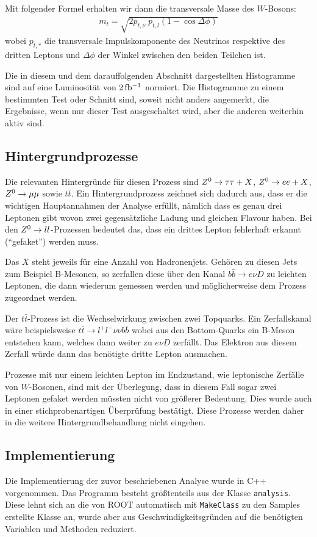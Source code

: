 Mit folgender Formel erhalten wir dann die transversale Masse des $W$-Bosons: 
\begin{align}
  m_t = \sqrt{2 p_{t,\nu}\; p_{t,l} (1 - \cos{\Delta\phi})}
  \label{eqn:trans}
\end{align}
wobei $p_{t,*}$ die transversale Impulskomponente des Neutrinos respektive des
dritten Leptons und $\Delta\phi$ der Winkel zwischen den beiden Teilchen ist.

Die in diesem und dem darauffolgenden Abschnitt dargestellten Histogramme sind
auf eine Luminosität von $\unit[2]{fb^{-1}}$ normiert. Die Histogramme zu einem
bestimmten Test oder Schnitt sind, soweit nicht anders angemerkt, die
Ergebnisse, wenn nur dieser Test ausgeschaltet wird, aber die anderen weiterhin
aktiv sind.

\subsection{Hintergrundprozesse}
Die relevanten Hintergründe für diesen Prozess sind $Z^0\to\tau\tau + X$, $Z^0\to
e e + X$, $Z^0\to\mu\mu$ sowie $t\bar{t}$. Ein Hintergrundprozess zeichnet sich
dadurch aus, dass er die wichtigen Hauptannahmen der Analyse erfüllt, nämlich
dass es genau drei Leptonen gibt wovon zwei gegensätzliche Ladung und gleichen
Flavour haben. Bei den $Z^0\to ll$-Prozessen bedeutet das, dass ein drittes
Lepton fehlerhaft erkannt ("`gefaket"') werden muss.

Das $X$ steht jeweils für eine Anzahl von Hadronenjets. Gehören zu diesen Jets
zum Beispiel B-Mesonen, so zerfallen diese über den Kanal $b\bar{b}\to e\nu D$
zu leichten Leptonen, die dann wiederum gemessen werden und möglicherweise dem
Prozess zugeordnet werden.

Der $t\bar{t}$-Prozess ist die Wechselwirkung zwischen zwei Topquarks. Ein
Zerfallskanal wäre beispielsweise $t\bar t\to l^+l^-\nu\nu b\bar{b}$ wobei aus
den Bottom-Quarks ein B-Meson entstehen kann, welches dann weiter zu $e\nu D$
zerfällt. Das Elektron aus diesem Zerfall würde dann das benötigte dritte Lepton
ausmachen.

Prozesse mit nur einem leichten Lepton im Endzustand, wie leptonische Zerfälle
von $W$-Bosonen, sind mit der Überlegung, dass in diesem Fall sogar zwei
Leptonen gefaket werden müssten nicht von größerer Bedeutung. Dies wurde auch in
einer stichprobenartigen Überprüfung bestätigt. Diese Prozesse werden daher in
die weitere Hintergrundbehandlung nicht eingehen.

\subsection{Implementierung}
Die Implementierung der zuvor beschriebenen Analyse wurde in C++ vorgenommen.
Das Programm besteht größtenteils aus der Klasse \lstinline!analysis!. Diese
lehnt sich an die von ROOT automatisch mit \lstinline!MakeClass! zu den Samples
erstellte Klasse an, wurde aber aus Geschwindigkeitsgründen auf die benötigten
Variablen und Methoden reduziert.

